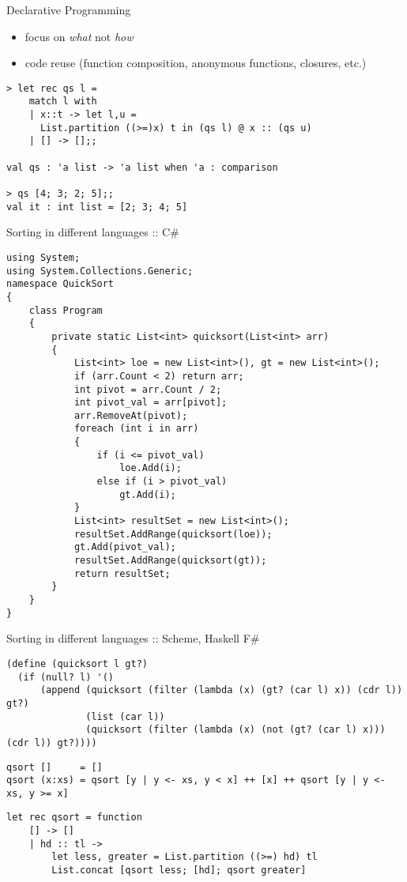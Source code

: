 \documentclass{beamer}
\begin{document}
\begin{frame}[fragile]{Declarative Programming}
  \begin{itemize}
    \item focus on \textit{what} not \textit{how}
    \item code reuse (function composition, anonymous functions, closures,
    etc.)
  \end{itemize}
  \begin{verbatim}
> let rec qs l =
    match l with
    | x::t -> let l,u =
      List.partition ((>=)x) t in (qs l) @ x :: (qs u) 
    | [] -> [];;

val qs : 'a list -> 'a list when 'a : comparison

> qs [4; 3; 2; 5];;
val it : int list = [2; 3; 4; 5]
  \end{verbatim}
\end{frame}

\begin{frame}[fragile]{Sorting in different languages :: C\#}
\tiny{
  \begin{verbatim}
using System;
using System.Collections.Generic;
namespace QuickSort
{
    class Program
    {
        private static List<int> quicksort(List<int> arr)
        {
            List<int> loe = new List<int>(), gt = new List<int>();
            if (arr.Count < 2) return arr;
            int pivot = arr.Count / 2;
            int pivot_val = arr[pivot];
            arr.RemoveAt(pivot);
            foreach (int i in arr)
            {
                if (i <= pivot_val)
                    loe.Add(i);
                else if (i > pivot_val)
                    gt.Add(i);
            }
            List<int> resultSet = new List<int>();
            resultSet.AddRange(quicksort(loe));
            gt.Add(pivot_val);
            resultSet.AddRange(quicksort(gt));
            return resultSet;
        }
    }
}
  \end{verbatim}
}
\end{frame}

\begin{frame}[fragile]{Sorting in different languages :: Scheme, Haskell F\#}
\tiny{
  \begin{verbatim}
(define (quicksort l gt?)
  (if (null? l) '()
      (append (quicksort (filter (lambda (x) (gt? (car l) x)) (cdr l)) gt?)
              (list (car l))
              (quicksort (filter (lambda (x) (not (gt? (car l) x))) (cdr l)) gt?))))
  \end{verbatim}

  \begin{verbatim}
qsort []     = []
qsort (x:xs) = qsort [y | y <- xs, y < x] ++ [x] ++ qsort [y | y <- xs, y >= x]
  \end{verbatim}

  \begin{verbatim}
let rec qsort = function
    [] -> []
    | hd :: tl ->
        let less, greater = List.partition ((>=) hd) tl
        List.concat [qsort less; [hd]; qsort greater]
  \end{verbatim}
}
\end{frame}
\end{document}
